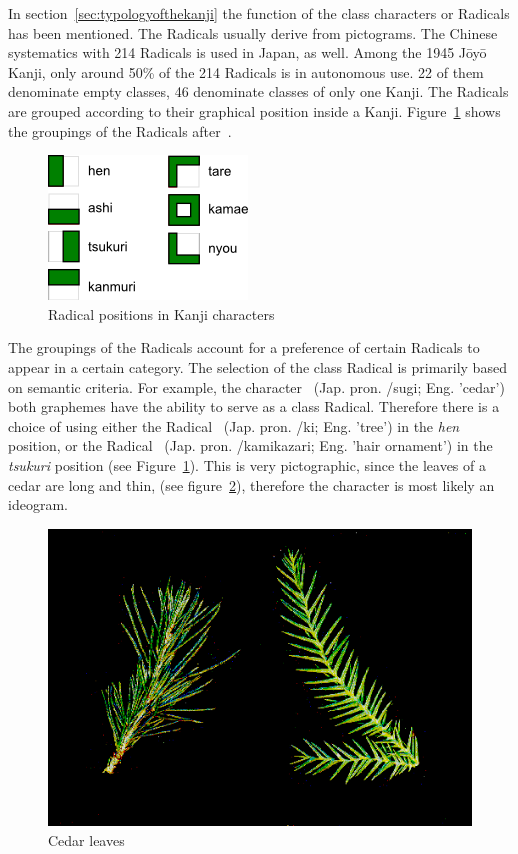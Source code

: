 In section~\ref{sec:typologyofthekanji} the function of the class characters or
Radicals has been mentioned. The Radicals usually derive from pictograms. The
Chinese systematics with 214 Radicals is used in Japan, as well. Among the 
1945 Jōyō Kanji, only around 50\% of the 214 Radicals is in autonomous use.
22 of them denominate empty classes, 46 denominate classes of only one Kanji.
The Radicals are grouped according to their graphical position inside a Kanji.
Figure~\ref{fig:radicalPositions} shows the groupings of the Radicals 
after~.
\begin{figure}[htbp]
\begin{center}
\includegraphics{images/radicalStructure/radicalPositions.png}
\caption{Radical positions in Kanji characters}
\label{fig:radicalPositions}
\end{center}
\end{figure}
The groupings of the Radicals account for a preference of certain Radicals
to appear in a certain category. The selection of the class Radical is primarily
based on semantic criteria. For example, the character ~(Jap. pron. 
/sugi; Eng. 'cedar') both graphemes have the ability to serve as a 
class Radical. Therefore there is a choice of using either the Radical 
~(Jap. pron. /ki; Eng. 'tree') in the \emph{hen} position, 
or the Radical ~(Jap. pron. /kamikazari; 
Eng. 'hair ornament') in the \emph{tsukuri} position (see 
Figure~\ref{fig:radicalPositions}). This is very pictographic, since the leaves
of a cedar are long and thin, (see figure~\ref{fig:cedarleaves}), 
therefore the character is most likely an ideogram.
\begin{figure}[htbp]
\begin{center}
\includegraphics[scale=0.4]{images/radicalStructure/cedar.png}
\caption{Cedar leaves}
\label{fig:cedarleaves}
\end{center}
\end{figure}
